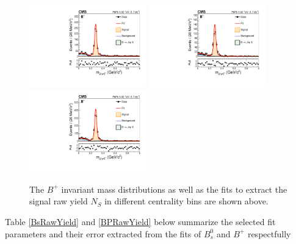 \begin{figure}[h]
\begin{center}
\includegraphics[width= 0.45\textwidth]{Figures/Chapter4/data_PbPb_1_Bpt_1050_doubly0_0_30_ntKp.pdf}
\includegraphics[width= 0.45\textwidth]{Figures/Chapter4/data_PbPb_1_Bpt_1050_doubly0_30_90_ntKp.pdf}
\includegraphics[width= 0.45\textwidth]{Figures/Chapter4/data_PbPb_1_Bpt_1050_doubly0_0_90_ntKp.pdf}
\caption{The $B^+$ invariant mass distributions as well as the fits to extract the signal raw yield $N_{S}$ in different centrality bins are shown above.}
\label{BPMassCent}
\end{center}
\end{figure}

Table \ref{BsRawYield} and \ref{BPRawYield} below summarize the selected fit parameters and their error extracted from the fits of $B^0_s$ and $B^+$ respectfully



